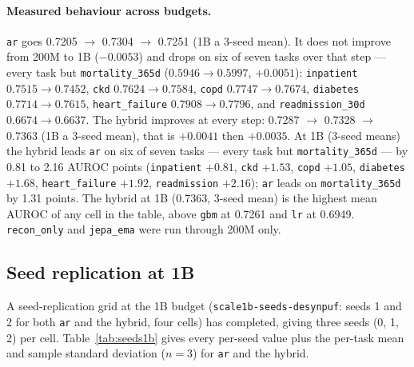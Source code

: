 \documentclass[11pt,a4paper]{article}
\newcommand{\code}[1]{\texttt{\small #1}}
\begin{document}
\paragraph{Measured behaviour across budgets.}
\code{ar} goes 0.7205 $\to$ 0.7304 $\to$ 0.7251 (1B a 3-seed mean). It does
not improve from 200M to 1B ($-0.0053$) and drops on six of seven tasks over
that step --- every task but \code{mortality\_365d} ($0.5946 \to 0.5997$,
$+0.0051$): \code{inpatient} $0.7515 \to 0.7452$, \code{ckd}
$0.7624 \to 0.7584$, \code{copd} $0.7747 \to 0.7674$, \code{diabetes}
$0.7714 \to 0.7615$, \code{heart\_failure} $0.7908 \to 0.7796$, and
\code{readmission\_30d} $0.6674 \to 0.6637$. The hybrid improves at every
step: 0.7287 $\to$ 0.7328 $\to$ 0.7363 (1B a 3-seed mean), that is $+0.0041$
then $+0.0035$. At 1B (3-seed means) the hybrid leads \code{ar} on six of
seven tasks --- every task but \code{mortality\_365d} --- by 0.81 to 2.16
AUROC points (\code{inpatient} $+0.81$, \code{ckd} $+1.53$, \code{copd}
$+1.05$, \code{diabetes} $+1.68$, \code{heart\_failure} $+1.92$,
\code{readmission} $+2.16$); \code{ar} leads on \code{mortality\_365d} by 1.31
points. The hybrid at 1B (0.7363, 3-seed mean) is the highest mean AUROC of
any cell in the table, above \code{gbm} at 0.7261 and \code{lr} at 0.6949.
\code{recon\_only} and \code{jepa\_ema} were run through 200M only.

\subsection{Seed replication at 1B}
\label{sec:seeds1b}

A seed-replication grid at the 1B budget (\code{scale1b-seeds-desynpuf}: seeds 1
and 2 for both \code{ar} and the hybrid, four cells) has completed, giving
three seeds (0, 1, 2) per cell. Table~\ref{tab:seeds1b} gives every per-seed
value plus the per-task mean and sample standard deviation ($n{=}3$) for
\code{ar} and the hybrid.
\end{document}
